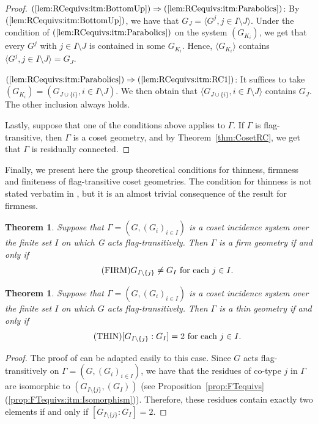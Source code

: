 \documentclass[11pt,letterpaper]{amsart}
\newtheorem{thm}[prop]{Theorem}
\begin{document}
\begin{proof}
    $(\ref{lem:RCequivs:itm:BottomUp})\Rightarrow (\ref{lem:RCequivs:itm:Parabolics})$: By $(\ref{lem:RCequivs:itm:BottomUp})$, we have that $G_J = \langle G^j, j \in I \setminus J \rangle$. Under the condition of $(\ref{lem:RCequivs:itm:Parabolics})$ on the system $(G_{K_i})$, we get that every $G^j$ with $j \in I\setminus J$ is contained in some $G_{K_i}$. Hence, $\langle G_{K_i} \rangle$ contains $\langle G^j, j \in I \setminus J \rangle = G_J$.
    
    $(\ref{lem:RCequivs:itm:Parabolics})\Rightarrow (\ref{lem:RCequivs:itm:RC1})$: It suffices to take $(G_{K_i}) = (G_{J \cup \{i\}}, i \in I \setminus J)$. We then obtain that $\langle G_{J \cup \{i\}}, i \in I \setminus J \rangle$ contains $G_J$. The other inclusion always holds.
    
    Lastly, suppose that one of the conditions above applies to $\Gamma$. If $\Gamma$ is flag-transitive, then $\Gamma$ is a coset geometry, and by Theorem~\ref{thm:CosetRC}, we get that $\Gamma$ is residually connected.

\end{proof}

Finally, we present here the group theoretical conditions for thinness, firmness and finiteness of flag-transitive coset geometries. The condition for thinness is not stated verbatim in \cite{buekenhout2013diagram}, but it is an almost trivial consequence of the result for firmness.

\begin{thm}\label{thm:CosetFIRM}\cite[Corollary 1.8.15]{buekenhout2013diagram}
     Suppose that $\Gamma = (G,(G_i)_{i\in I})$ is a coset incidence system over
the finite set $I$ on which G acts flag-transitively. Then $\Gamma$ is a firm geometry if and only if
\begin{equation}\tag{FIRM}
    G_{I\setminus \{j\} } \neq G_I \textnormal{ for each }j \in I.
\end{equation}
\end{thm}

\begin{thm}\label{thm:CosetThin}\cite[Corollary 1.8.15]{buekenhout2013diagram}
     Suppose that $\Gamma = (G,(G_i)_{i\in I})$ is a coset incidence system over
the finite set $I$ on which $G$ acts flag-transitively. Then $\Gamma$ is a thin geometry if and only if
\begin{equation}\tag{THIN}
    [G_{I\setminus \{j\} } : G_I] = 2 \textnormal{ for each }j \in I.
\end{equation}
\end{thm}
\begin{proof}
    The proof of \cite[Corollary 1.8.15]{buekenhout2013diagram} can be adapted easily to this case. Since $G$ acts flag-transitively on $\Gamma = (G,(G_i)_{i\in I})$, we have that the residues of co-type $j$ in $\Gamma$ are isomorphic to $(G_{I\setminus \{j\} }, (G_I))$ (see Proposition~\ref{prop:FTequivs}(\ref{prop:FTequivs:itm:Isomorphism})). Therefore, these residues contain exactly two elements if and only if $[G_{I\setminus \{j\} } : G_I] = 2$.
\end{proof}
\end{document}
